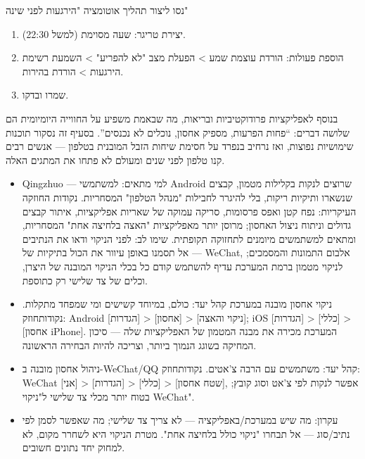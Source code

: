 \begin{tcbpractice}{נסו ליצור תהליך אוטומציה "הירגעות לפני שינה"}
\begin{enumerate}
  \item יצירת טריגר: שעה מסוימת (למשל 22:30).
  \item הוספת פעולות: הורדת עוצמת שמע > הפעלת מצב "לא להפריע" > השמעת רשימת הירגעות > הורדת בהירות.
  \item שמרו ובדקו.
\end{enumerate}

\end{tcbpractice}


בנוסף לאפליקציות פרודוקטיביות ובריאות, מה שבאמת משפיע על החווייה היומיומית הם שלושה דברים: “פחות הפרעות, מספיק אחסון, נוכלים לא נכנסים”. בסעיף זה נסקור תוכנות שימושיות נפוצות, ואז נרחיב בנפרד על חסימת שיחות הזבל המובנית בטלפון — אנשים רבים קנו טלפון לפני שנים ומעולם לא פתחו את המתגים האלה.


\begin{itemize}
  \item Qingzhuo — למי מתאים: למשתמשי Android שרוצים לנקות בקלילות מטמון, קבצים שנשארו ותיקיות ריקות, בלי להיגרר לחבילות "מנהל הטלפון" המסחריות. נקודות החוזקה העיקריות: נפח קטן ואפס פרסומות, סריקה עמוקה של שאריות אפליקציות, איתור קבצים גדולים וניתוח ניצול האחסון; מרוסן יותר מאפליקציות "האצה בלחיצה אחת" המסחריות, ומתאים למשתמשים מיומנים לתחזוקה תקופתית. שימו לב: לפני הניקוי ודאו את הנתיבים — אל תסמנו באופן עיוור את הכול בתיקיות של WeChat, אלבום התמונות והמסמכים; לניקוי מטמון ברמת המערכת עדיף להשתמש קודם כל בכלי הניקוי המובנה של היצרן, וכלים של צד שלישי רק כתוספת.
  \item ניקוי אחסון מובנה במערכת קהל יעד: כולם, במיוחד קשישים ומי שמפחד מתקלות. נקודותחוזק: Android [הגדרות] > [אחסון] > [ניקוי והאצה]; iOS [הגדרות] > [כללי] > [אחסון iPhone]. המערכת מכירה את מבנה המטמון של האפליקציות שלה — סיכון המחיקה בשוגג הנמוך ביותר, וצריכה להיות הבחירה הראשונה.
  \item ניהול אחסון מובנה ב-WeChat/QQ קהל יעד: משתמשים עם הרבה צ'אטים. נקודותחוזק: WeChat [אני] > [הגדרות] > [כללי] > [שטח אחסון], אפשר לנקות לפי צ'אט וסוג קובץ; בטוח יותר מכלי צד שלישי ל"ניקוי WeChat".
  \item עקרון: מה שיש במערכת/באפליקציה — לא צריך צד שלישי; מה שאפשר לסמן לפי נתיב/סוג — אל תבחרו "ניקוי כולל בלחיצה אחת". מטרת הניקוי היא לשחרר מקום, לא למחוק יחד נתונים חשובים.
\end{itemize}

